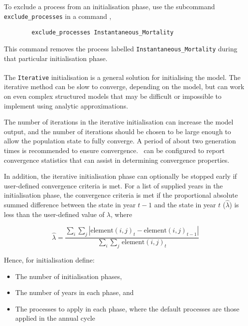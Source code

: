 To exclude a process from an initialisation phase, use the subcommand \texttt{exclude\_processes} in a command ,

{\small{\begin{verbatim}
		exclude_processes Instantaneous_Mortality
		\end{verbatim}}}

This command removes the process labelled \texttt{Instantaneous\_Mortality} during that particular initialisation phase.

\paragraph{}

The \texttt{Iterative} initialisation is a general solution for initialising the model. The iterative method can be slow to converge, depending on the model, but can work on even complex structured models that may be difficult or impossible to implement using analytic approximations.

The number of iterations in the iterative initialisation can increase the model output, and the number of iterations should be chosen to be large enough to allow the population state to fully converge. A period of about two generation times is recommended to ensure convergence. \CNAME\ can be configured to report convergence statistics that can assist in determining convergence properties.

In addition, the iterative initialisation phase can optionally be stopped early if user-defined convergence criteria is met. For a list of supplied years in the initialisation phase, the convergence criteria is met if the proportional absolute summed difference between the state in year $t-1$ and the state in year $t$ ($\widehat{\lambda}$) is less than the user-defined value of $\lambda$, where

\begin{equation}
  \widehat{\lambda} = \frac{\sum\limits_{i} \sum\limits_{j} \left|\text{element}(i,j)_t - \text{element}(i,j)_{t-1} \right|}{\sum\limits_{i} \sum\limits_{j} \frac{}{}\text{element}(i,j)_t}
\end{equation}

Hence, for initialisation define:

\begin{itemize}
  \item The number of initialisation phases,
  \item The number of years in each phase, and
  \item The processes to apply in each phase, where the default processes are those applied in the annual cycle
\end{itemize}

